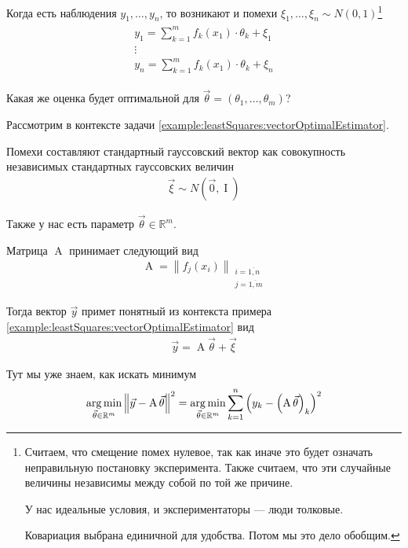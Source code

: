 Когда есть наблюдения $y_1, \dots, y_n$, то возникают и помехи
$\xi_1, \dots, \xi_n \sim N\left( 0, 1 \right)$\footnote{Считаем, что смещение
помех нулевое, так как иначе это будет означать неправильную постановку
эксперимента. Также считаем, что эти случайные величины независимы между собой
по той же причине.

У нас идеальные условия, и экспериментаторы --- люди толковые.

Ковариация выбрана единичной для удобства. Потом мы это дело обобщим.}
\begin{align*}
  \begin{array}{c}
      y_1 = \sum_{k=1}^{m} f_k\left( x_1 \right) \cdot \theta_k + \xi_1 \\
      \vdots \\
      y_n = \sum_{k=1}^{m} f_k\left( x_1 \right) \cdot \theta_k + \xi_n
  \end{array}
\end{align*}

Какая же оценка будет оптимальной для
$\vec{\theta} = \left( \theta_1, \dots, \theta_m \right)$?

Рассмотрим в контексте задачи \ref{example:leastSquares:vectorOptimalEstimator}.

\begin{example}
  Помехи составляют стандартный гауссовский вектор как совокупность
  независимых стандартных гауссовских величин
  \begin{align*}
      \vec{\xi} \sim N\left( \vec{0}, \operatorname{I} \right)
  \end{align*}

  Также у нас есть параметр $\vec{\theta} \in \mathbb{R}^m$.

  Матрица $\operatorname{A}$ принимает следующий вид
  \begin{align*}
      \operatorname{A} = \left\| f_j\left( x_i \right) \right\|_{
      \substack{i = \overline{1, n} \\ j = \overline{1, m}}}
  \end{align*}

  Тогда вектор $\vec{y}$ примет понятный из контекста примера
  \ref{example:leastSquares:vectorOptimalEstimator} вид
  \begin{align*}
      \vec{y} = \operatorname{A} \vec{\theta} + \vec{\xi}
  \end{align*}

  Тут мы уже знаем, как искать минимум
  \begin{align*}
      \argminof{\left\| \vec{y} - \operatorname{A} \vec{\theta} \right\|^2}{
      \vec{\theta} \in \mathbb{R}^m}
      = \argminof{\sum_{k=1}^{n} \left( y_k
          - \left( \operatorname{A} \vec{\theta} \right)_k \right)^2}{
      \vec{\theta} \in \mathbb{R}^m}
  \end{align*}
\end{example}

